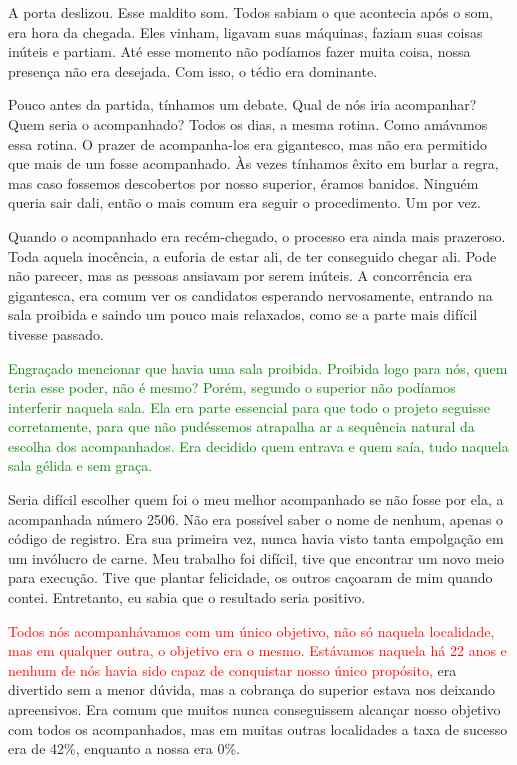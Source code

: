 \documentclass{book}
\begin{document}
\begin{multicols}{2}
	
	A porta deslizou. Esse maldito som. Todos sabiam o que acontecia após o som, era hora da chegada. Eles vinham, ligavam suas máquinas, faziam suas coisas inúteis e partiam. Até esse momento não podíamos fazer muita coisa, nossa presença não era desejada. Com isso, o tédio era dominante.
	
	\begin{flushleft}
		
		Pouco antes da partida, tínhamos um debate. Qual de nós iria acompanhar? Quem seria o acompanhado? Todos os dias, a mesma rotina. Como amávamos essa rotina. O prazer de acompanha-los era gigantesco, mas não era permitido que mais de um fosse acompanhado. Às vezes tínhamos êxito em burlar a regra, mas caso fossemos descobertos por nosso superior, éramos banidos. Ninguém queria sair dali, então o mais comum era seguir o procedimento. Um por vez.
		
	\end{flushleft}
	
	Quando o acompanhado era recém-chegado, o processo era ainda mais prazeroso. Toda aquela inocência, a euforia de estar ali, de ter conseguido chegar ali. Pode não parecer, mas as pessoas ansiavam por serem inúteis. A concorrência era gigantesca, era comum ver os candidatos esperando nervosamente, entrando na sala proibida e saindo um pouco mais relaxados, como se a parte mais difícil tivesse passado.
	
	\textcolor{green}{ Engraçado mencionar que havia uma sala proibida. Proibida logo para nós, quem teria esse poder, não é mesmo? Porém, segundo o superior não podíamos interferir naquela sala. Ela era parte essencial para que todo o projeto seguisse corretamente, para que não pudéssemos atrapalha ar a sequência natural da escolha dos acompanhados. Era decidido quem entrava e quem saía, tudo naquela sala gélida e sem graça.}
	
	Seria difícil escolher quem foi o meu melhor acompanhado se não fosse por ela, a acompanhada número 2506. Não era possível saber o nome de nenhum, apenas o código de registro. Era sua primeira vez, nunca havia visto tanta empolgação em um invólucro de carne. Meu trabalho foi difícil, tive que encontrar um novo meio para execução. Tive que plantar felicidade, os outros caçoaram de mim quando contei. Entretanto, eu sabia que o resultado seria positivo.
	
	\textcolor{red}{Todos nós acompanhávamos com um único objetivo, não só naquela localidade, mas em qualquer outra, o objetivo era o mesmo. Estávamos naquela há 22 anos e nenhum de nós havia sido capaz de conquistar nosso único propósito,} era divertido sem a menor dúvida, mas a cobrança do superior estava nos deixando apreensivos. Era comum que muitos nunca conseguissem alcançar nosso objetivo com todos os acompanhados, mas em muitas outras localidades a taxa de sucesso era de 42\%, enquanto a nossa era 0\%.
	

\end{multicols}
\end{document}
